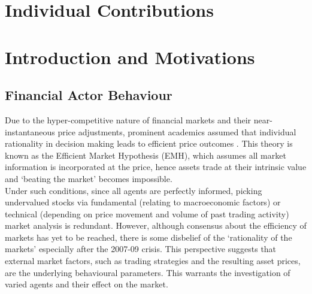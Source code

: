 \documentclass[11pt]{article}
\begin{document}
\newpage

\section{Individual Contributions}

\section{Introduction and Motivations}
\subsection{Financial Actor Behaviour}

Due to the hyper-competitive nature of financial markets and their near-instantaneous price adjustments, prominent academics assumed that individual rationality in decision making leads to efficient price outcomes \citep{zeckhauser1991nonrational}. This theory is known as the Efficient Market Hypothesis (EMH), which assumes all market information is incorporated at the price, hence assets trade at their intrinsic value and `beating the market' becomes impossible. \\
Under such conditions, since all agents are perfectly informed, picking undervalued stocks via fundamental (relating to macroeconomic factors) or technical (depending on price movement and volume of past trading activity) market analysis is redundant. However, although consensus about the efficiency of markets has yet to be reached, there is some disbelief of the ‘rationality of the markets’ especially after the 2007-09 crisis. This perspective suggests that external market factors, such as trading strategies and the resulting asset prices, are the underlying behavioural parameters. This warrants the investigation of varied agents and their effect on the market. \\
\end{document}

